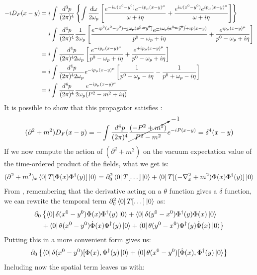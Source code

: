 \documentclass[../main.tex]{subfiles}
\begin{document}
\begin{align*}
-iD_F(x-y)&=i\int\frac{d^3p}{(2\pi)^4}\left\{\int\frac{d\omega}{2\omega_p}\left[\frac{e^{-i\omega(x^0-y^0)}e^{-ip_\mu(x-y)^\mu}}{\omega+i\eta}+\frac{e^{i\omega(x^0-y^0)}e^{ip_\mu(x-y)^\mu}}{\omega+i\eta}\right]\right\}\\
&=i\int\frac{d^4p}{(2\pi)^4}\frac{1}{2\omega_p}\left[\frac{e^{-ip^0(x^0-y^0)+\cancel{i\omega_p(x^0-y^0)}}e^{\cancel{-i\omega_p(x^0-y^0)}+ip(x-y)}}{p^0-\omega_p+i\eta}+\frac{e^{ip_\mu(x-y)^\mu}}{p^0-\omega_p+i\eta}\right]\\
&=i\int\frac{d^4p}{(2\pi)^42\omega_p}\left[\frac{e^{-ip_\mu(x-y)^\mu}}{p^0-\omega_p+i\eta}+\frac{e^{+ip_\mu(x-y)^\mu}}{p^0-\omega_p+i\eta}\right]\\
&=i\int\frac{d^4p}{(2\pi)^42\omega_p}e^{-ip_\mu(x-y)^\mu}\left[\frac{1}{p^0-\omega_p-i\eta}-\frac{1}{p^0+\omega_p-i\eta}\right]\\
&=i\int\frac{d^4p}{(2\pi)^4}\frac{e^{-ip_\mu(x-y)^\mu}}{2\omega_p(P^2-m^2+i\eta)}
\end{align*}
It is possible to show that this propagator satisfies :
\[
(\partial^2+m^2)D_F(x-y)=-\int\frac{d^4p}{(2\pi)^4}\cancelto{-1}{\frac{(-P^2+m^2)}{P^2-m^2}}e^{-iP(x-y)}=\delta^4(x-y)
\]
If we now compute the action of $(\partial^2+m^2)$ on the vacuum expectation value of the time-ordered product of the fields, what we get is:
\[
(\partial^2+m^2)_x\bra{0}T[\Phi(x)\Phi^\dagger(y)]\ket{0}=\partial_0^2\bra{0}T[\dots]\ket{0}+\bra{0}T[(-\nabla^2_x+m^2)\Phi(x)\Phi^\dagger(y)]\ket{0}
\]
From , remembering that the derivative acting on a $\theta$ function gives a $\delta$ function, we can rewrite the temporal term $\partial_0^2\bra{0}T[\dots]\ket{0}$ as:
\begin{align*}
\partial_0&\left\{\bra{0}\delta(x^0-y^0)\Phi(x)\Phi^\dagger(y)\ket{0}+\bra{0}\delta(y^0-x^0)\Phi^\dagger(y)\Phi(x)\ket{0}\right.\\
&\left.+\bra{0}\theta(x^0-y^0)\Dot{\Phi}(x)\Phi^\dagger(y)\ket{0}+\bra{0}\theta(y^0-x^0)\Phi^\dagger(y)\Dot{\Phi}(x)\ket{0}\right\}
\end{align*}
Putting this in a more convenient form gives us:
\[
\partial_0\left\{\bra{0}\delta(x^0-y^0)[\Phi(x),\Phi^\dagger(y)\ket{0}+\bra{0}\theta(x^0-y^0)[\Dot{\Phi}(x),\Phi^\dagger(y)\ket{0}\right\}
\]
Including now the spatial term leaves us with:
\end{document}
